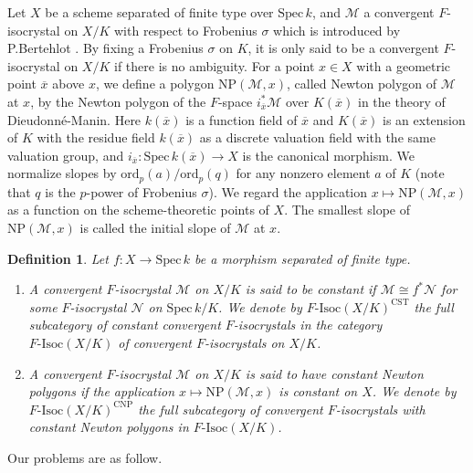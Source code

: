 \documentclass[11pt]{amsart}
\newtheorem{definition}[Lemma]{Definition}
\begin{document}
Let $X$ be a scheme separated of finite type over $\mathrm{Spec}\, k$, and $\mathcal M$ a convergent 
$F$-isocrystal on $X/K$ with respect to Frobenius $\sigma$ which is introduced by P.Bertehlot \cite{Be0} \cite{Be} \cite{Be1}. 
By fixing a Frobenius $\sigma$ on $K$, it is only said to be a convergent $F$-isocrystal on $X/K$ if there is no ambiguity. 
For a point $x \in X$ with a geometric point $\overline{x}$ above $x$, 
we define a polygon $\mathrm{NP}(\mathcal M, x)$, called Newton polygon of $\mathcal M$ at $x$, by 
the Newton polygon of the $F$-space $i_{\overline{x}}^\ast\mathcal M$ 
over $K(\overline{x})$ in the theory of Dieudonn\'e-Manin.  
Here $k(\overline{x})$ is a function field of $\overline{x}$ and $K(\overline{x})$ is an extension of $K$ 
with the residue field $k(\overline{x})$ as a discrete valuation field with the same valuation group, and 
$i_{\overline{x}} : \mathrm{Spec}\, k(\overline{x}) \rightarrow X$ is the canonical morphism. 
We normalize slopes by $\mathrm{ord}_p(a)/\mathrm{ord}_p(q)$ for any nonzero element $a$ of $K$ 
(note that $q$ is the $p$-power of Frobenius $\sigma$). 
We regard the application $x \mapsto \mathrm{NP}(\mathcal M, x)$ as a function 
on the scheme-theoretic points of $X$. 
The smallest slope of $\mathrm{NP}(\mathcal M, x)$ is called the initial slope of $\mathcal M$ at $x$. 

\begin{definition}\label{CNP} Let $f : X \rightarrow \mathrm{Spec}\, k$ be a morphism 
separated of finite type. 
\begin{enumerate} 
\item A convergent $F$-isocrystal $\mathcal M$ on $X/K$ is said to be constant if 
$\mathcal M \cong f^\ast\mathcal N$ for some $F$-isocrystal $\mathcal N$ on $\mathrm{Spec}\, k/K$. 
We denote  by $F\mbox{-}\mathrm{Isoc}(X/K)^{\mathrm{CST}}$ the full subcategory of constant convergent $F$-isocrystals 
in the category $F\mbox{-}\mathrm{Isoc}(X/K)$ of 
convergent $F$-isocrystals on $X/K$.
\item A convergent $F$-isocrystal $\mathcal M$ on $X/K$ is said to have constant Newton polygons 
if the application $x \mapsto \mathrm{NP}(\mathcal M, x)$ is constant on $X$. 
We denote by $F\mbox{-}\mathrm{Isoc}(X/K)^{\mathrm{CNP}}$ 
the full subcategory of convergent $F$-isocrystals with constant Newton polygons 
in $F\mbox{-}\mathrm{Isoc}(X/K)$. 
\end{enumerate}
\end{definition}

Our problems are as follow. 
\end{document}
